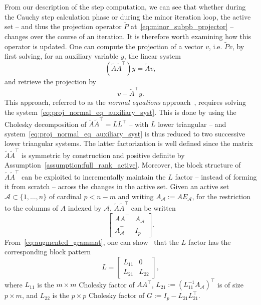 \documentclass{article}
\numberwithin{equation}{section}
\newcommand{\calA}{{\mathcal{A}}}
\theoremstyle{plain}
\begin{document}
	From our description of the step computation, we can see that whether during the Cauchy step calculation phase or during the minor iteration loop, the active set -- and thus the projection operator $\tilde{P}$ at~\eqref{eq:minor_subpb_projector} -- changes over the course of an iteration. It is therefore worth examining how this operator is updated. One can compute the projection of a vector $v$, i.e. $\tilde{P}v$, by first solving, for an auxiliary variable $y$, the linear system
	\begin{equation}\label{eq:proj_normal_eq_auxiliary_syst}
		\left(\tilde{A}\tilde{A}^\top\right)y = \tilde{A}v,
	\end{equation}
	and retrieve the projection by
	\begin{equation}
		v - \tilde{A}^\top y.
	\end{equation}
	This approach, referred to as the \textit{normal equations} approach~\cite{gould-etal:2001}, requires solving the system~\eqref{eq:proj_normal_eq_auxiliary_syst}. This is done by using the Cholesky decomposition of $\tilde{A}\tilde{A}^\top = LL^\top$ -- with $L$ lower triangular -- and system~\eqref{eq:proj_normal_eq_auxiliary_syst} is thus reduced to two successive lower triangular systems. The latter factorization is well defined since the matrix $\tilde{A}\tilde{A}^\top$ is symmetric by construction and positive definite by Assumption~\ref{assumption:full_rank_active}. Moreover, the block structure of $\tilde{A}\tilde{A}^\top$ can be exploited to incrementally maintain the $L$ factor -- instead of forming it from scratch -- across the changes in the active set. Given an active set $\calA \subset \{1,\ldots,n\}$ of cardinal $p < n-m$ and writing $A_\calA := AE_\calA$, for the restriction to the columns of $A$ indexed by $\calA$, $\tilde{A}\tilde{A}^\top $ can be written
	\begin{equation}\label{eq:augmented_grammat}
		\begin{bmatrix}
			AA^\top &  A_{\calA} \\  A_{\calA}^\top & I_p
		\end{bmatrix}.
	\end{equation}
	From~\eqref{eq:augmented_grammat}, one can show~\cite[see Section 4.2.9]{golubvanloan:2013} that the $L$ factor has the corresponding block pattern
	\[L = \begin{bmatrix}
		L_{11} & 0 \\ L_{21} & L_{22}
	\end{bmatrix},\]
	where 
	$L_{11}$ is the $m \times m$ Cholesky factor of $AA^\top$, $L_{21} := (L_{11}^{-1} A_{\calA})^\top$ is of size $p \times m$, and $L_{22}$ is the $p \times p$ Cholesky factor of $G := I_p - L_{21}L_{21}^\top$.
\end{document}
